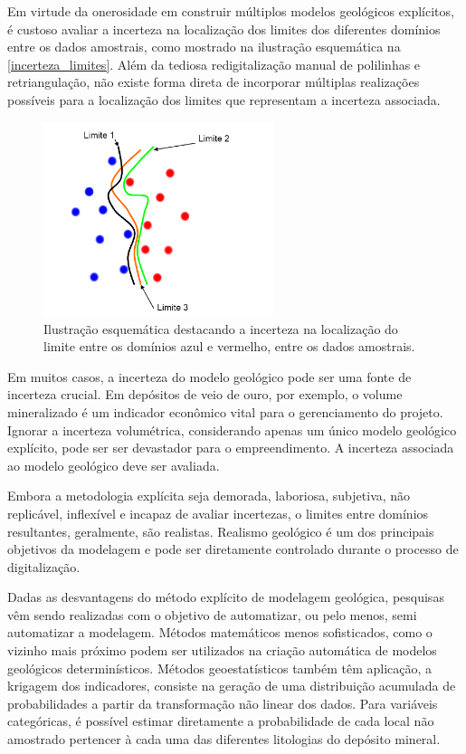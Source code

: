 Em virtude da onerosidade em construir múltiplos modelos geológicos explícitos, é custoso avaliar a incerteza na localização dos limites dos diferentes domínios entre os dados amostrais, como mostrado na ilustração esquemática na \autoref{incerteza_limites}. Além da tediosa redigitalização manual de polilinhas e retriangulação, não existe forma direta de incorporar múltiplas realizações possíveis para a localização dos limites que representam a incerteza associada.

\begin{figure}[!htb]
	\caption{\label{incerteza_limites}Ilustração esquemática destacando a incerteza na localização do limite entre os domínios azul e vermelho, entre os dados amostrais.}
	\begin{center}
		\includegraphics[width=0.6\textwidth]{capitulo_1/incerteza_limites}
	\end{center}
\end{figure}

Em muitos casos, a incerteza do modelo geológico pode ser uma fonte de incerteza crucial. Em depósitos de veio de ouro, por exemplo, o volume mineralizado é um indicador econômico vital para o gerenciamento do projeto. Ignorar a incerteza volumétrica, considerando apenas um único modelo geológico explícito, pode ser ser devastador para o empreendimento. A incerteza associada ao modelo geológico deve ser avaliada.

Embora a metodologia explícita seja demorada, laboriosa, subjetiva, não replicável, inflexível e incapaz de avaliar incertezas, o limites entre domínios resultantes, geralmente, são realistas. Realismo geológico é um dos principais objetivos da modelagem e pode ser diretamente controlado durante o processo de digitalização. 

Dadas as desvantagens do método explícito de modelagem geológica, pesquisas vêm sendo realizadas com o objetivo de automatizar, ou pelo menos, semi automatizar a modelagem. Métodos matemáticos menos sofisticados, como o vizinho mais próximo podem ser utilizados na criação automática de modelos geológicos determinísticos.  Métodos geoestatísticos também têm aplicação, a krigagem dos indicadores, \cite{journel1982indicator} consiste na geração de uma distribuição acumulada de probabilidades a partir da transformação não linear dos dados. Para variáveis categóricas, é possível estimar diretamente a probabilidade de cada local não amostrado pertencer à cada uma das diferentes litologias do depósito mineral.

